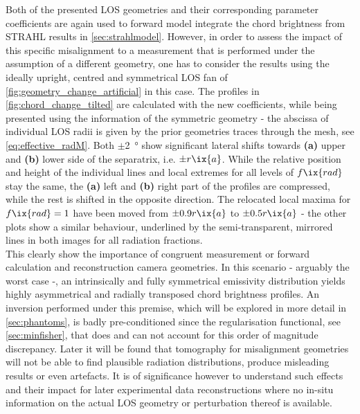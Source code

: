             Both of the presented LOS geometries and their corresponding parameter coefficients are again used to forward model integrate the chord brightness from STRAHL results in \cref{sec:strahlmodel}. However, in order to assess the impact of this specific misalignment to a measurement that is performed under the assumption of a different geometry, one has to consider the results using the ideally upright, centred and symmetrical LOS fan of \cref{fig:geometry_change_artificial} in this case. The profiles in \cref{fig:chord_change_tilted} are calculated with the new coefficients, while being presented using the information of the symmetric geometry - the abscissa of individual LOS radii is given by the prior geometries traces through the mesh, see \cref{eq:effective_radM}. Both $\pm$\SI{2}{\degree} show significant lateral shifts towards \textbf{(a)} upper and \textbf{(b)} lower side of the separatrix, i.e. $\pm r\ix{a}$. While the relative position and height of the individual lines and local extremes for all levels of $f\ix{rad}$ stay the same, the \textbf{(a)} left and \textbf{(b)} right part of the profiles are compressed, while the rest is shifted in the opposite direction. The relocated local maxima for $f\ix{rad}=1$ have been moved from $\pm0.9r\ix{a}$ to $\pm0.5r\ix{a}$ - the other plots show a similar behaviour, underlined by the semi-transparent, mirrored lines in both images for all radiation fractions.\\%
            This clearly show the importance of congruent measurement or forward calculation and reconstruction camera geometries. In this scenario - arguably the worst case -, an intrinsically and fully symmetrical emissivity distribution yields highly asymmetrical and radially transposed chord brightness profiles. An inversion performed under this premise, which will be explored in more detail in \cref{sec:phantoms}, is badly pre-conditioned since the regularisation functional, see \cref{sec:minfisher}, that does and can not account for this order of magnitude discrepancy. Later it will be found that tomography for misalignment geometries will not be able to find plausible radiation distributions, produce misleading results or even artefacts. It is of significance however to understand such effects and their impact for later experimental data reconstructions where no in-situ information on the actual LOS geometry or perturbation thereof is available.%
%
        \newline%
